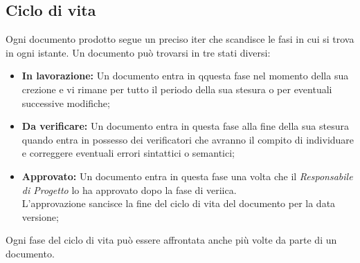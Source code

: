     \subsection{Ciclo di vita}\label{subsec:ciclovita}
      Ogni documento prodotto segue un preciso iter che scandisce le fasi in cui si trova in ogni istante. Un documento può trovarsi in tre stati diversi:\\
      \begin{itemize}
        \item \textbf{In lavorazione: }Un documento entra in qquesta fase nel momento della sua crezione e vi rimane per tutto il periodo della sua stesura
          o per eventuali successive modifiche;
        \item \textbf{Da verificare: }Un documento entra in questa fase alla fine della sua stesura quando entra in possesso dei verificatori che avranno il compito
          di individuare e correggere eventuali errori sintattici o semantici;
        \item \textbf{Approvato: }Un documento entra in questa fase una volta che il \emph{Responsabile di Progetto} lo ha approvato dopo la fase di veriica.\\
          L'approvazione sancisce la fine del ciclo di vita del documento per la data versione;
      \end{itemize}
      Ogni fase del ciclo di vita può essere affrontata anche più volte da parte di un documento.
